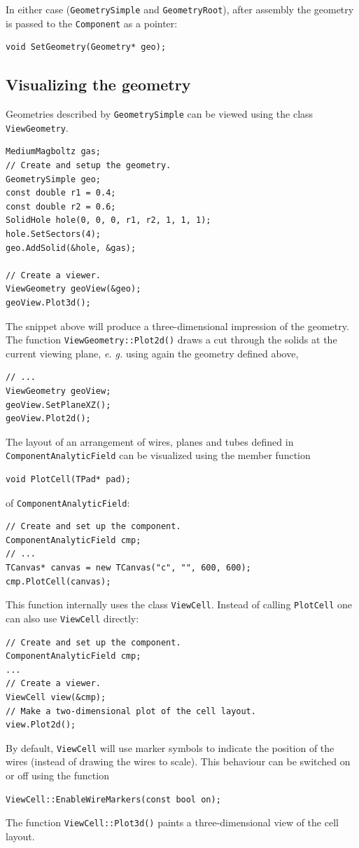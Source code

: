 In either case (\texttt{GeometrySimple} and \texttt{GeometryRoot}),
after assembly the geometry is passed to the \texttt{Component} as a pointer:
\begin{lstlisting}
void SetGeometry(Geometry* geo);
\end{lstlisting}

\subsection{Visualizing the geometry}

Geometries described by \texttt{GeometrySimple} can be viewed 
using the class \texttt{ViewGeometry}. 
\begin{lstlisting}
MediumMagboltz gas;
// Create and setup the geometry.
GeometrySimple geo;
const double r1 = 0.4;
const double r2 = 0.6;
SolidHole hole(0, 0, 0, r1, r2, 1, 1, 1);
hole.SetSectors(4);
geo.AddSolid(&hole, &gas);

// Create a viewer.
ViewGeometry geoView(&geo);
geoView.Plot3d();
\end{lstlisting}
The snippet above will produce a three-dimensional impression of the geometry.
The function \texttt{ViewGeometry::Plot2d()} draws a cut through the solids 
at the current viewing plane, \textit{e. g.} using again the geometry defined above,
\begin{lstlisting}
// ...
ViewGeometry geoView;
geoView.SetPlaneXZ();
geoView.Plot2d();
\end{lstlisting} 


The layout of an arrangement of wires, planes and tubes
defined in \texttt{ComponentAnalyticField} can be visualized using 
the member function
\begin{lstlisting}
void PlotCell(TPad* pad);
\end{lstlisting}
of \texttt{ComponentAnalyticField}:
\begin{lstlisting}
// Create and set up the component.
ComponentAnalyticField cmp;
// ...
TCanvas* canvas = new TCanvas("c", "", 600, 600);
cmp.PlotCell(canvas); 
\end{lstlisting}
This function internally uses the class \texttt{ViewCell}.
Instead of calling \texttt{PlotCell} one can also use \texttt{ViewCell} directly:
\begin{lstlisting}
// Create and set up the component.
ComponentAnalyticField cmp;
... 
// Create a viewer.
ViewCell view(&cmp);
// Make a two-dimensional plot of the cell layout.
view.Plot2d();
\end{lstlisting}
By default, \texttt{ViewCell} will use marker symbols to indicate the position of the wires (instead of drawing the wires to scale). 
This behaviour can be switched on or off using the function
\begin{lstlisting}
ViewCell::EnableWireMarkers(const bool on);
\end{lstlisting} 
The function \texttt{ViewCell::Plot3d()} paints
a three-dimensional view of the cell layout.

